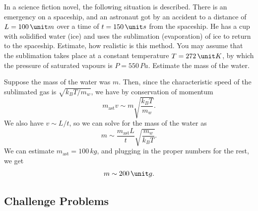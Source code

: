 \documentclass[11pt]{scrartcl}
\begin{document}
\begin{prob}[Kalda]
    In a science fiction novel, the following situation is
described. There is an emergency on a spaceship, and an astronaut got by an accident to a distance of $L = 100\,\unit m$ over a time of $t=150\, \unit s$ from the
spaceship. He has a cup with solidified water (ice) and uses the
sublimation (evaporation) of ice to return to the spaceship. Estimate, how realistic is this method. You may assume that the
sublimation takes place at a constant temperature $T = 272\,\unit K$,
by which the pressure of saturated vapours is $P = 550\, \unit{Pa}$. Estimate the mass of the water.
\end{prob}
\begin{sol}
    Suppose the mass of the water was $m$. Then, since the characteristic speed of the sublimated gas is $\sqrt{k_BT/m_{w}}$, we have by conservation of momentum
    $$m_{\text{ast}}v \sim m\sqrt{\frac{k_BT}{m_w}}.$$
    We also have $v \sim L/t$, so we can solve for the mass of the water as
    $$m \sim \frac{m_{\text{ast}}L}{t}\sqrt{\frac{m_w}{k_BT}}.$$
    We can estimate $m_{\text{ast}} = 100 \, \unit {kg}$, and plugging in the proper numbers for the rest, we get
    $$m \sim 200 \, \unit g.$$
\end{sol}

\subsection{Challenge Problems}
\end{document}

